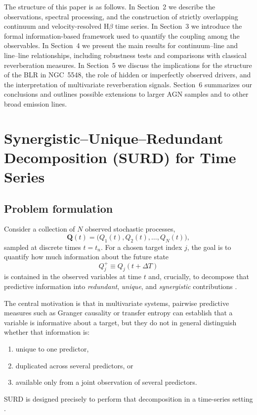 \documentclass[12pt, a4paper]{article}
\begin{document}
The structure of this paper is as follows. In Section~2 we describe the observations, spectral processing, and the construction of strictly overlapping continuum and velocity-resolved H$\beta$ time series. In Section~3 we introduce the formal information-based framework used to quantify the coupling among the observables. In Section~4 we present the main results for continuum--line and line--line relationships, including robustness tests and comparisons with classical reverberation measures. In Section~5 we discuss the implications for the structure of the BLR in NGC~5548, the role of hidden or imperfectly observed drivers, and the interpretation of multivariate reverberation signals. Section~6 summarizes our conclusions and outlines possible extensions to larger AGN samples and to other broad emission lines.


\section{Synergistic--Unique--Redundant Decomposition (SURD) for Time Series}
\label{sec:surd_method}

\subsection{Problem formulation}

Consider a collection of \(N\) observed stochastic processes,
\begin{equation}
\mathbf{Q}(t)=\bigl(Q_1(t),Q_2(t),\ldots,Q_N(t)\bigr),
\end{equation}
sampled at discrete times \(t=t_n\). For a chosen target index \(j\), the goal is to quantify how much information about the future state
\begin{equation}
Q_j^+ \equiv Q_j(t+\Delta T)
\end{equation}
is contained in the observed variables at time \(t\) and, crucially, to decompose that predictive information into \emph{redundant}, \emph{unique}, and \emph{synergistic} contributions \cite{MartinezSanchez2024SURD}.

The central motivation is that in multivariate systems, pairwise predictive measures such as Granger causality or transfer entropy can establish that a variable is informative about a target, but they do not in general distinguish whether that information is:
\begin{enumerate}
    \item unique to one predictor,
    \item duplicated across several predictors, or
    \item available only from a joint observation of several predictors.
\end{enumerate}
SURD is designed precisely to perform that decomposition in a time-series setting \cite{MartinezSanchez2024SURD,Schreiber2000,WilliamsBeer2010}.
\end{document}
